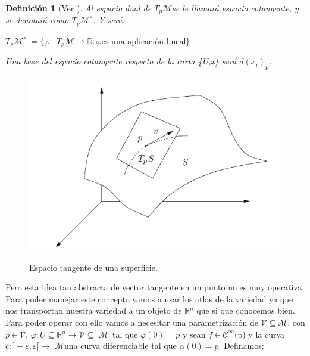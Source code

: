 \documentclass[pdftex,11pt,a4paper]{book}
\newtheorem{defi}{Definici\'on}
\newcommand{\M}{$\mathscr{M}$}
\newcommand{\tpm}{$T_p\mathscr{M}$}
\newcommand{\R}{$\mathbb{R}$}
\begin{document}
\begin{defi}[Ver \cite{WinterSchool}]
Al espacio dual de \tpm se le llamará espacio cotangente, y se denotará como \tpm$^*$. Y será:
\begin{center}
    \tpm$^*:=\{\varphi:$ \tpm$ \to$\R $: \varphi \text{es una aplicación lineal}  \}$
\end{center}
Una base del espacio cotangente respecto de la carta \{U,x\} será $d(x_i)_p$.
\end{defi}

\begin{figure}[!ht]
\centering
\includegraphics[scale=0.5]{imagenTpS.png}
\label{Fig:TpS}
\caption{ Espacio tangente de una superficie.\cite{gondinho}}
\end{figure}
\newpage

Pero esta idea tan abstracta de vector tangente en un punto no es muy operativa. Para poder manejar este concepto vamos a usar los atlas de la variedad ya que nos transportan nuestra variedad a un objeto de \R$^n$ que si que conocemos bien. Para poder operar con ello vamos a necesitar una parametrización de $ \mathscr{V} \subseteq$\M, con $p \in \mathscr{V} $, $\varphi : U\subseteq $\R$^n \rightarrow  \mathscr{V} \subseteq$ \M \  tal que $\varphi (0)= p$ y sean $f \in \mathscr{C}^\infty$(p) y la curva $c:]-\varepsilon, \varepsilon[ \rightarrow$ \M una curva diferenciable tal que $\alpha(0)=p$. Definamos:\\
\end{document}
